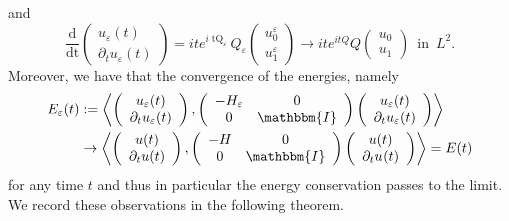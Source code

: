 \documentclass[11pt, oneside]{article}   	%
\newcommand{\assign}{:=}
\newcommand{\mathd}{\mathrm{d}}
\newcommand{\tmop}[1]{\ensuremath{\operatorname{#1}}}
\begin{document}
and
\[ \frac{\mathd}{\tmop{dt}} \left(\begin{array}{c}
u_{\varepsilon} (t)\\
\partial_t u_{\varepsilon} (t)
\end{array}\right) = i t e^{i \tmop{tQ}_{\varepsilon}} Q_{\varepsilon}
\left(\begin{array}{c}
u^{\varepsilon}_0\\
u^{\varepsilon}_1
\end{array}\right) \rightarrow i t e^{i t Q} Q \left(\begin{array}{c}
u_0\\
u_1
\end{array}\right) \  \tmop{in} \  L^2 . \]
Moreover, we have that the convergence of the energies, namely
\begin{align*} E_{\varepsilon} (t) & \assign \left\langle \left(\begin{array}{c}
u_{\varepsilon} (t)\\
\partial_t u_{\varepsilon} (t)
\end{array}\right), \left( \begin{array}{cc}
- H_{\varepsilon} & 0\\
0 & \mathbbm{I}
\end{array} \right) \left(\begin{array}{c}
u_{\varepsilon} (t)\\
\partial_t u_{\varepsilon} (t)
\end{array}\right) \right\rangle \\
&  \rightarrow \left\langle
\left(\begin{array}{c}
u (t)\\
\partial_t u (t)
\end{array}\right), \left( \begin{array}{cc}
- H & 0\\
0 & \mathbbm{I}
\end{array} \right) \left(\begin{array}{c}
u (t)\\
\partial_t u_{} (t)
\end{array}\right) \right\rangle = E (t) \end{align*}
for any time $t$ and thus in particular the energy conservation passes to the
limit. We record these observations in the following theorem.
\end{document}
